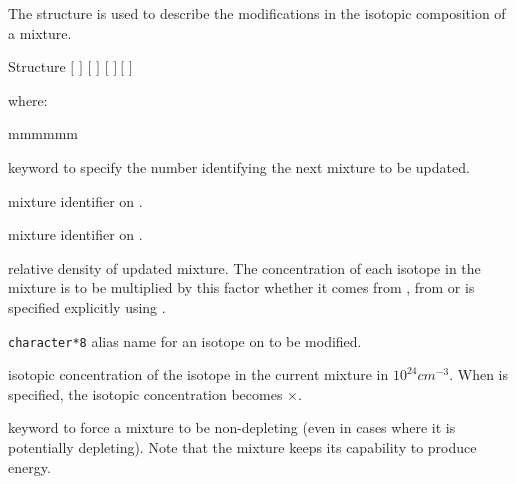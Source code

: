 \vskip 0.15cm

The structure  is used to describe the modifications in the
isotopic composition of a mixture.

\begin{DataStructure}{Structure }
   $[$  $]$ $[$  $]$
$[$   $]~[$  $]$
\end{DataStructure}

\noindent
where:

\begin{ListeDeDescription}{mmmmmm}

\item[\moc{MIX}] keyword to specify the number identifying the next mixture to
be updated.

\item[\dusa{matnum}] mixture identifier on . 

\item[\dusa{matold}] mixture identifier on .

\item[\dusa{relden}] relative density of updated mixture. The  concentration
of each isotope in the mixture is to be multiplied by this factor whether it 
comes from , from  or is
specified explicitly using . 

\item[\dusa{NAMALI}] {\tt character*8} alias name for an isotope on
 to be modified. 

\item[\dusa{dens}] isotopic concentration of the isotope  in the
current mixture in $10^{24}cm^{-3}$.  When  is specified, the
isotopic concentration becomes $\times$.

\item[\moc{NOEV}] keyword to force a mixture to be non-depleting (even in
cases where it is potentially depleting). Note that the mixture keeps its
capability to produce energy.

\end{ListeDeDescription}
\eject
